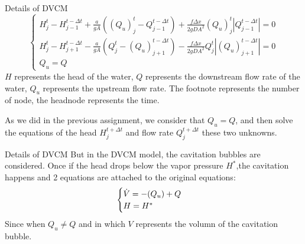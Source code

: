 \documentclass[UTF8]{ctexbeamer}
\begin{document}
\begin{frame}{Details of DVCM}
    \begin{equation}
        \tag{1}
        \begin{cases}
            H^t_j-H^{t-\Delta t}_{j-1}+\frac{a}{gA}({(Q_u)}^t_j-Q^{t-\Delta t}_{j-1})+\frac{f\Delta x}{2 g D A^2}{(Q_u)}^t_j|Q^{t-\Delta t}_{j-1}|=0\\
            H^t_j-H^{t-\Delta t}_{j+1}-\frac{a}{gA}(Q^t_j-{(Q_u)}^{t-\Delta t}_{j+1})-\frac{f\Delta x}{2 g D A^2}Q^t_j|{(Q_u)}^{t-\Delta t}_{j+1}|=0\\
            Q_u = Q
        \end{cases}
    \end{equation}
    $H$ represents the head of the water, $Q$ represents the downstream flow rate of the water, $Q_u$ represents the upstream flow rate. The footnote represents the number of node, the headnode represents the time.
    
    \qquad As we did in the previous assignment, we consider that $Q_u = Q$, and then solve the equations of the head $H^{t+\Delta t}_j$ and flow rate $Q^{t+\Delta t}_j$ these two unknowns.
\end{frame}

\begin{frame}{Details of DVCM}
    But in the DVCM model, the cavitation bubbles are considered. Once if the head drops below the vapor pressure $H^*$,the cavitation happens and 2 equations are attached to the original equations:
    \begin{equation}
        \begin{cases}
            \notag
            \dot V = -(Q_u) + Q\\
            H = H^*
        \end{cases}
    \end{equation}
    Since when $Q_u \neq Q$ and in which $V$ represents the volumn of the cavitation bubble.
\end{frame}
\end{document}
